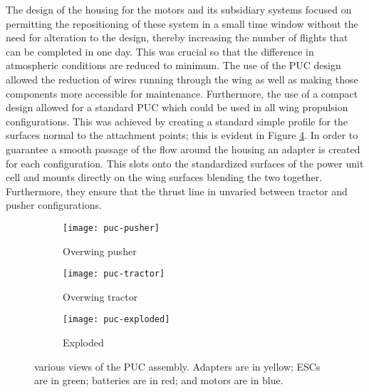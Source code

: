 \documentclass[../../main.tex]{subfiles}
\begin{document}
The design of the housing for the motors and its subsidiary systems focused on permitting the repositioning of these system in a small time window without the need for alteration to the design, thereby increasing the number of flights that can be completed in one day.
This was crucial so that the difference in atmospheric conditions are reduced to minimum. 
The use of the PUC design allowed the reduction of wires running through the wing as well as making those components more accessible for maintenance.
Furthermore, the use of a compact design allowed for a standard PUC which could be used in all wing propulsion configurations.
This was achieved by creating a standard simple profile for the surfaces normal to the attachment points; this is evident in Figure \ref{fig:puc-assemblies}.
In order to guarantee a smooth passage of the flow around the housing an adapter is created for each configuration.
This slots onto the standardized surfaces of the power unit cell and mounts directly on the wing surfaces blending the two together.
Furthermore, they ensure that the thrust line in unvaried between tractor and pusher configurations. 


\begin{figure}[H]
    \centering
    \begin{subfigure}[b]{0.49\columnwidth}
        \centering
        \texttt{[image: puc-pusher]}
        \caption{Overwing pusher}
        \label{fig:puc-assemblies:pusher}
    \end{subfigure}
    \hfill
    \begin{subfigure}[b]{0.49\columnwidth}
        \centering
        \texttt{[image: puc-tractor]}
        \caption{Overwing tractor}
        \label{fig:puc-assemblies:tractor}
    \end{subfigure}

    \begin{subfigure}[b]{0.7\columnwidth}
        \centering
        \texttt{[image: puc-exploded]}
        \caption{Exploded}
        \label{fig:puc-assemblies:exploded}
    \end{subfigure}
    
    \caption{
        various views of the PUC assembly.
        Adapters are in yellow; ESCs are in green; batteries are in red; and motors are in blue.
    }
    \label{fig:puc-assemblies}
\end{figure} 
\end{document}
